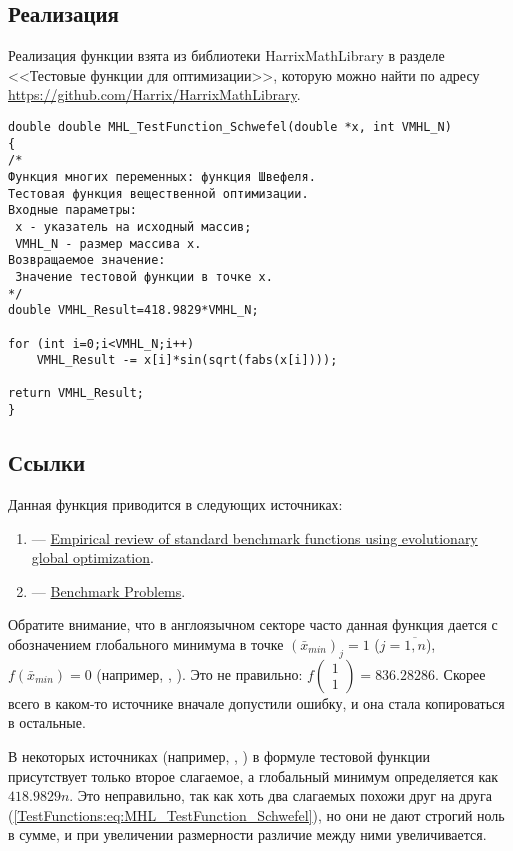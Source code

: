 \subsection {Реализация}

Реализация функции взята из библиотеки HarrixMathLibrary в разделе <<Тестовые функции для оптимизации>>, которую можно найти по адресу \href{https://github.com/Harrix/HarrixMathLibrary} {https://github.com/Harrix/HarrixMathLibrary}.

\begin{lstlisting}[caption=Код функции MHL\_TestFunction\_Schwefel]
double double MHL_TestFunction_Schwefel(double *x, int VMHL_N)
{
/*
Функция многих переменных: функция Швефеля.
Тестовая функция вещественной оптимизации.
Входные параметры:
 x - указатель на исходный массив;
 VMHL_N - размер массива x.
Возвращаемое значение:
 Значение тестовой функции в точке x.
*/
double VMHL_Result=418.9829*VMHL_N;

for (int i=0;i<VMHL_N;i++)
    VMHL_Result -= x[i]*sin(sqrt(fabs(x[i])));

return VMHL_Result;
}
\end{lstlisting}

\subsection {Ссылки}

Данная функция приводится в следующих источниках:

\begin{enumerate}
\item \cite[стр. 9]{web:1207.4318} ---  \href{http://arxiv.org/pdf/1207.4318v1.pdf}{Empirical review of standard benchmark functions using evolutionary global optimization}.
\item \cite{web:www.cs.cmu.edu:BenchmarkProblems} ---  \href{http://www.cs.cmu.edu/afs/cs/project/jair/pub/volume24/ortizboyer05a-html/node6.html}{Benchmark Problems}.
\end{enumerate}

Обратите внимание, что в англоязычном секторе часто данная функция дается с обозначением глобального минимума в точке $\left(\bar{x}_{min} \right)_j=1$ ($j=\overline{1,n}$), $f\left(\bar{x}_{min} \right) =0$ (например, \cite{web:www.sfu.ca:SchwefelFunction}, \cite{web:www-optima.amp.i.kyoto-u.ac.jp:SchwefelFunction}). Это не правильно: $f\left(\begin{matrix}
1 \\ 1
\end{matrix} \right) =836.28286$. Скорее всего в каком-то источнике вначале допустили ошибку, и она стала копироваться в остальные.

В некоторых источниках (например, \cite{web:www.pg.gda.pl:Schwefelsfunction7}, \cite[стр. 7]{web:GEATbxExamples}) в формуле тестовой функции присутствует только второе слагаемое, а глобальный минимум определяется как $ 418.9829 n $. Это неправильно, так как хоть два слагаемых похожи друг на друга (\ref{TestFunctions:eq:MHL_TestFunction_Schwefel}), но они не дают строгий ноль в сумме, и при увеличении размерности различие между ними увеличивается.